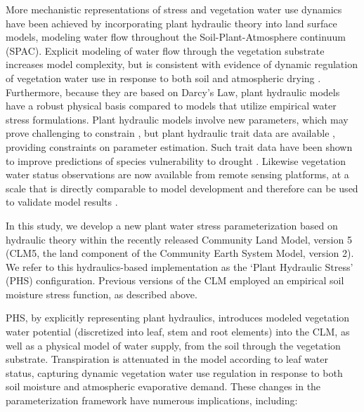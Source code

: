 \documentclass[draft,linenumbers]{agujournal}
\begin{document}
More mechanistic representations of stress and vegetation water use dynamics have been achieved by incorporating plant hydraulic theory into land surface models, modeling water flow throughout the Soil-Plant-Atmosphere continuum (SPAC)\citep{xu2016,christoffersen2016,sperry2017}.
Explicit modeling of water flow through the vegetation substrate increases model complexity, but is consistent with evidence of dynamic regulation of vegetation water use in response to both soil and atmospheric drying \citep{tardieu1998,sperry1998,sperry2015}.
Furthermore, because they are based on Darcy's Law, plant hydraulic models have a robust physical basis compared to models that utilize empirical water stress formulations.
Plant hydraulic models involve new parameters, which may prove challenging to constrain \citep{drake2017}, but plant hydraulic trait data are available \citep{kattge2011,anderegg2015a}, providing constraints on parameter estimation.   
Such trait data have been shown to improve predictions of species vulnerability to drought \citep{choat2012}.
Likewise vegetation water status observations are now available from remote sensing platforms, at a scale that is directly comparable to model development \citep{konings2016,grant2016} and therefore can be used to validate model results \citep{momen2017,konings2017b}.

In this study, we develop a new plant water stress parameterization based on hydraulic theory within the recently released Community Land Model, version 5 (CLM5, the land component of the Community Earth System Model, version 2). 
We refer to this hydraulics-based implementation as the `Plant Hydraulic Stress' (PHS) configuration. 
Previous versions of the CLM employed an empirical soil moisture stress function, as described above.


PHS, by explicitly representing plant hydraulics, introduces modeled vegetation water potential (discretized into leaf, stem and root elements) into the CLM, as well as a physical model of water supply, from the soil through the vegetation substrate. 
Transpiration is attenuated in the model according to leaf water status, capturing dynamic vegetation water use regulation in response to both soil moisture and atmospheric evaporative demand. 
These changes in the parameterization framework have numerous implications, including: 
\end{document}
